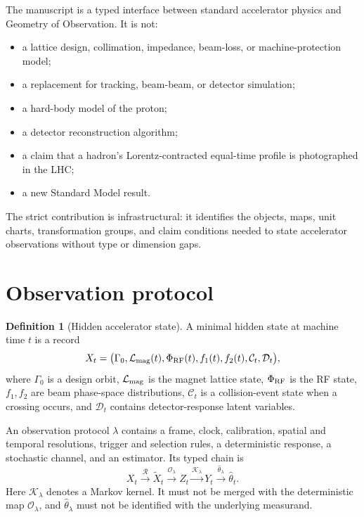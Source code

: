 \documentclass[11pt,a4paper]{article}
\theoremstyle{definition}
\newtheorem{definition}{Definition}[section]
\theoremstyle{plain}
\theoremstyle{remark}
\newcommand{\Ocal}{\mathcal O}
\newcommand{\Kcal}{\mathcal K}
\newcommand{\Rcal}{\mathcal R}
\begin{document}
The manuscript is a typed interface between standard accelerator
physics and Geometry of Observation. It is not:
\begin{itemize}
  \item a lattice design, collimation, impedance, beam-loss, or
  machine-protection model;
  \item a replacement for tracking, beam-beam, or detector simulation;
  \item a hard-body model of the proton;
  \item a detector reconstruction algorithm;
  \item a claim that a hadron's Lorentz-contracted equal-time profile
  is photographed in the LHC;
  \item a new Standard Model result.
\end{itemize}

The strict contribution is infrastructural: it identifies the objects,
maps, unit charts, transformation groups, and claim conditions needed
to state accelerator observations without type or dimension gaps.

\section{Observation protocol}

\begin{definition}[Hidden accelerator state]
A minimal hidden state at machine time \(t\) is a record
\[
X_t=
\bigl(
\Gamma_0,\mathcal L_{\rm mag}(t),\Phi_{\rm RF}(t),
f_1(t),f_2(t),\mathcal C_t,\mathcal D_t
\bigr),
\]
where \(\Gamma_0\) is a design orbit, \(\mathcal L_{\rm mag}\) is the
magnet lattice state, \(\Phi_{\rm RF}\) is the RF state,
\(f_1,f_2\) are beam phase-space distributions,
\(\mathcal C_t\) is a collision-event state when a crossing occurs,
and \(\mathcal D_t\) contains detector-response latent variables.
\end{definition}

An observation protocol \(\lambda\) contains a frame, clock,
calibration, spatial and temporal resolutions, trigger and selection
rules, a deterministic response, a stochastic channel, and an
estimator. Its typed chain is
\[
X_t\xrightarrow{\Rcal}\widetilde X_t
\xrightarrow{\Ocal_\lambda}Z_t
\xrightarrow{\Kcal_\lambda}Y_t
\xrightarrow{\widehat\theta_\lambda}\widehat\theta_t.
\]
Here \(\Kcal_\lambda\) denotes a Markov kernel. It must not be merged
with the deterministic map \(\Ocal_\lambda\), and
\(\widehat\theta_\lambda\) must not be identified with the underlying
measurand.
\end{document}
